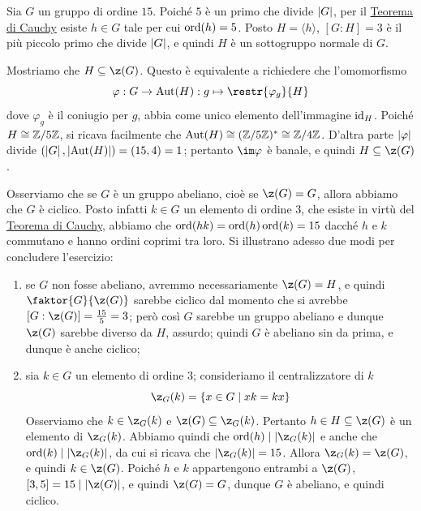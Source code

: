 \documentclass[11pt]{scrartcl}
\begin{document}
	\begin{soln}
		Sia $G$ un gruppo di ordine $15$. Poiché $5$ è un primo che divide $\left\lvert G \right\rvert$,
		per il \hyperref[teorema1.44]{Teorema di Cauchy} esiste $h \in G$ tale per cui $\operatorname{ord}(h) = 5$. Posto $H = \langle h\rangle$, $[G:H] = 3$ è il più piccolo primo che divide $\left\lvert G \right\rvert$, e quindi $H$ è un sottogruppo 
		normale di $G$. \medskip
		
		
		Mostriamo che $H \subseteq \z(G)$. Questo è equivalente a 
		richiedere che l'omomorfismo \[
		\varphi: G \to \Aut(H) : g \mapsto \restr{\varphi_{g}}{H}
		\]
		dove $\varphi_g$ è il coniugio per $g$, abbia come unico elemento dell'immagine
		$\mathrm{id}_H$.
		Poiché $H \cong \mathbb{Z}/{5}\mathbb{Z}$, si ricava facilmente che $\operatorname{Aut}(H) \cong (\mathbb{Z}/{5}\mathbb{Z})^* \cong \mathbb{Z}/{4}\mathbb{Z}$. D'altra 
		parte $\left\lvert \varphi \right\rvert$ divide $(\left\lvert G \right\rvert, \left\lvert \operatorname{Aut}(H) \right\rvert) = (15, 4) = 1$; pertanto
		$\im \varphi$ è banale, e quindi $H \subseteq \z(G)$. \medskip
		
		
		Osserviamo che se $G$ è un gruppo abeliano, cioè se $\z(G) = G$,
		allora abbiamo che $G$ è ciclico. Posto infatti $k \in G$ un elemento di 
		ordine $3$, che esiste in virtù del \hyperref[teorema1.44]{Teorema di Cauchy},
		abbiamo che $\operatorname{ord}(hk) = \operatorname{ord}(h)\operatorname{ord}(k) = 15$ dacché $h$ e $k$ commutano e hanno
		ordini coprimi tra loro.
		Si illustrano adesso due modi per concludere l'esercizio:
		\begin{enumerate}[(1)]
			\item se $G$ non fosse abeliano, avremmo 
			necessariamente $\z(G) = H$, e quindi $\faktor{G}{\z(G)}$ sarebbe ciclico 
			dal momento che si avrebbe $[G : \z(G)] = \frac{15}{5} = 3$; però così $G$ sarebbe un gruppo abeliano e dunque $\z(G)$ sarebbe diverso da $H$, assurdo; quindi $G$
			è abeliano sin da prima, e dunque è anche ciclico;
			\item sia $k \in G$ un elemento di ordine 3; consideriamo il centralizzatore
			di $k$
			\[
			\z_G(k) = \{x \in G\mid xk = kx\}
			\]Osserviamo che $k \in \z_G(k)$ e $\z(G) \subseteq \z_G(k)$. Pertanto $h \in H \subseteq \z(G)$ è un elemento 
			di $\z_G(k)$. Abbiamo quindi che $\ord(h)\mid \abs{\z_G(k)}$ e anche che $\ord(k)\mid \abs{\z_G(k)}$, 
			da cui si ricava che $\abs{\z_G(k)} = 15$. Allora $\z_G(k) = \z(G)$, e quindi
			$k \in \z(G)$. Poiché $h$ e $k$ appartengono entrambi a $\z(G)$,
			$[3, 5] = 15 \mid \abs{\z(G)}$, e quindi $\z(G) = G$, dunque
			$G$ è abeliano, e quindi ciclico.
		\end{enumerate}
	\end{soln}
	
\end{document}
